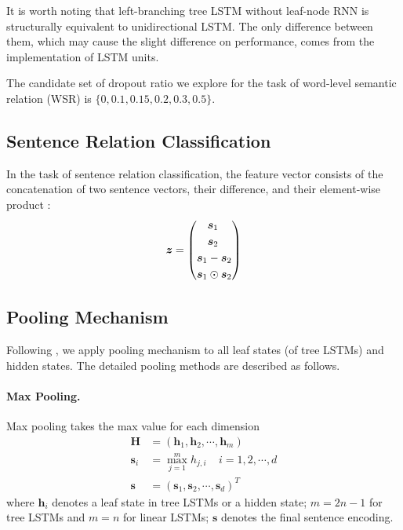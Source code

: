 \documentclass[11pt,a4paper]{article}
\begin{document}
It is worth noting that left-branching tree LSTM without leaf-node RNN is structurally equivalent to unidirectional LSTM. The only difference between them, which may cause the slight difference on performance, comes from the implementation of LSTM units. 

The candidate set of dropout ratio we explore for the task of word-level semantic relation (WSR) is $\{0, 0.1, 0.15, 0.2, 0.3, 0.5\}$.

\subsection{Sentence Relation Classification}
In the task of sentence relation classification, the feature vector consists of the concatenation of two sentence vectors, their difference, and their element-wise product \cite{mou2016natural}:
\begin{equation*}
\centering
\bm{z} = \left(
\begin{aligned} 
&\bm{s}_1 \\
&\bm{s}_2 \\
\bm{s}_1 &- \bm{s}_2 \\
\bm{s}_1 &\odot \bm{s}_2
\end{aligned}
\right)
\end{equation*}

\subsection{Pooling Mechanism}
Following \cite{socher2011dynamic}, we apply pooling mechanism to all leaf states (of tree LSTMs) and hidden states.  The detailed pooling methods are described as follows. 

\paragraph{Max Pooling.}
Max pooling takes the max value for each dimension 
\begin{equation*}
\begin{aligned}
\bm{H} &= (\bm{h}_1, \bm{h}_2, \cdots, \bm{h}_{m}) \\
\bm{s}_i &= \max_{j=1}^m h_{j,i} ~~~~~  i=1, 2, \cdots, d \\
\bm{s} &= (\bm{s}_1, \bm{s}_2, \cdots, \bm{s}_d)^T
\end{aligned}
\end{equation*}
where $\bm{h}_i$ denotes a leaf state in tree LSTMs or a hidden state; $m=2n-1$ for tree LSTMs and $m=n$ for linear LSTMs; $\bm{s}$ denotes the final sentence encoding.
\end{document}
